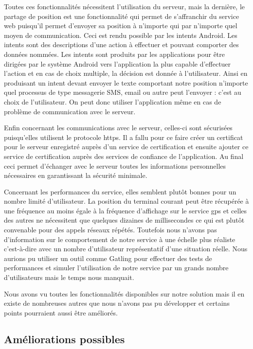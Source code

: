 Toutes ces fonctionnalités nécessitent l’utilisation du serveur, mais la dernière, le partage de position est une fonctionnalité qui permet de s’affranchir du service web puisqu’il permet d’envoyer sa position à n’importe qui par n’importe quel moyen de communication. Ceci est rendu possible par les intents Android. Les intents sont des descriptions d’une action à effectuer et pouvant comporter des données nommées. Les intents sont produits par les applications pour être dirigées par le système Android vers l’application la plus capable d’effectuer l’action et en cas de choix multiple, la décision est donnée à l’utilisateur. Ainsi en produisant un intent devant envoyer le texte comportant notre position n’importe quel processus de type messagerie SMS, email ou autre peut l’envoyer : c’est au choix de l’utilisateur. On peut donc utiliser l’application même en cas de problème de communication avec le serveur.

Enfin concernant les communications avec le serveur, celles-ci sont sécurisées puisqu’elles utilisent le protocole https. Il a fallu pour ce faire créer un certificat pour le serveur enregistré auprès d’un service de certification et ensuite ajouter ce service de certification auprès des services de confiance de l’application. Au final ceci permet d’échanger avec le serveur toutes les informations personnelles nécessaires en garantissant la sécurité minimale.

Concernant les performances du service, elles semblent plutôt bonnes pour un nombre limité d’utilisateur. La position du terminal courant peut être récupérée à une fréquence au moins égale à la fréquence d’affichage sur le service gps et celles des autres ne nécessitent que quelques dizaines de millisecondes ce qui est plutôt convenable pour des appels réseaux répétés. Toutefois nous n’avons pas d’information sur le comportement de notre service à une échelle plus réaliste c’est-à-dire avec un nombre d’utilisateur représentatif d’une situation réelle. Nous aurions pu utiliser un outil comme Gatling pour effectuer des tests de performances et simuler l'utilisation de notre service par un grands nombre d'utilisateurs mais le temps nous manquait.

Nous avons vu toutes les fonctionnalités disponibles sur notre solution mais il en existe de nombreuses autres que nous n’avons pas pu développer et certains points pourraient aussi être améliorés.

\subsection{Améliorations possibles}

